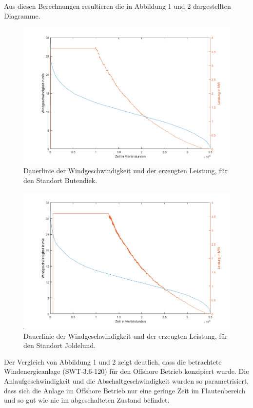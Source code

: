 \documentclass[a4paper,12pt]{article}
\begin{document}
	Aus diesen Berechnungen resultieren die in Abbildung 1 und 2 dargestellten Diagramme.
	\begin{figure}[H]
		\centering
		\includegraphics[width=12cm]{img/results/Dauerlinie_Offshore}
		\caption{Dauerlinie der Windgeschwindigkeit und der erzeugten Leistung, für den Standort Butendiek.}
	\end{figure}
	\begin{figure}[H]
		\centering
		\includegraphics[width=12cm]{img/results/Dauerlinie_Onshore}
		\caption{Dauerlinie der Windgeschwindigkeit und der erzeugten Leistung, für den Standort Joldelund.}
	\end{figure}
	\noindent Der Vergleich von Abbildung 1 und 2 zeigt deutlich, dass die betrachtete Windenergieanlage (SWT-3.6-120) für den Offshore Betrieb konzipiert wurde. Die Anlaufgeschwindigkeit und die Abschaltgeschwindigkeit wurden so parametrisiert, dass sich die Anlage im Offshore Betrieb nur eine geringe Zeit im Flautenbereich und so gut wie nie im abgeschalteten Zustand befindet.\\ \par
\end{document}
